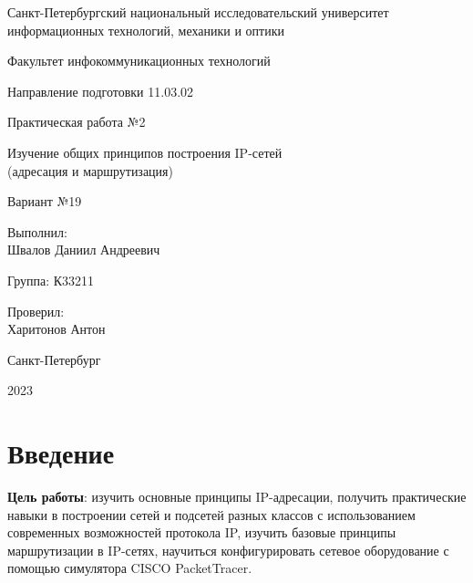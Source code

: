 \documentclass[a4paper, 14pt]{extarticle}
\begin{document}
\begin{titlepage}
  \vspace{0pt plus2fill}
  \noindent

  \vspace{0pt plus6fill}
  \begin{center}
    Санкт-Петербургский национальный исследовательский университет
    информационных технологий, механики и оптики

    \vspace{0pt plus3fill}

    Факультет инфокоммуникационных технологий

    Направление подготовки 11.03.02

    \vspace{0pt plus2fill}

    Практическая работа №2

    Изучение общих принципов построения IP-сетей \\ (адресация и маршрутизация)

    \vspace{0pt plus1fill}

    Вариант №19

  \end{center}

  \vspace{0pt plus7fill}
  \begin{flushright}
    Выполнил: \\
    Швалов Даниил Андреевич

    Группа: К33211

    Проверил: \\
    Харитонов Антон
  \end{flushright}

  \vspace{0pt plus2fill}
  \begin{center}
    Санкт-Петербург

    2023
  \end{center}
\end{titlepage}

\setcounter{page}{2}

\section{Введение}

\textbf{Цель работы}: изучить основные принципы IP-адресации, получить
практические навыки в построении сетей и подсетей разных классов с
использованием современных возможностей протокола IP, изучить базовые принципы
маршрутизации в IP-сетях, научиться конфигурировать сетевое оборудование с
помощью симулятора CISCO PacketTracer.
\end{document}
